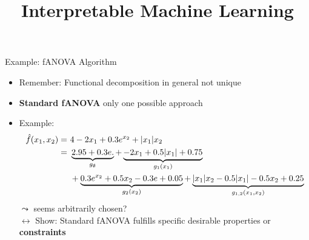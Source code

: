 \documentclass[10pt,compress,t,notes=noshow, xcolor=table]{beamer}
\title{Interpretable Machine Learning}
\date{}
\begin{document}


\begin{frame}{Example: fANOVA Algorithm}
    \begin{itemize}
        \item Remember: Functional decomposition in general not unique
        \item \textbf{Standard fANOVA} only one possible approach
        \item Example:
        \begin{align*}
            \hat{f}(x_1, x_2) =\,&\,4 - 2x_1 + 0.3 e^{x_2} + |x_1|x_2 \\
            =\,&\,\underbrace{2.95 + 0.3 e.}_{g_\emptyset} + \underbrace{-2x_1 + 0.5|x_1| + 0.75}_{g_1(x_1)} \\
            \,&\,+ \underbrace{0.3 e^{x_2} + 0.5x_2 - 0.3e + 0.05}_{g_2(x_2)} + \underbrace{|x_1| x_2 - 0.5 |x_1| - 0.5 x_2 + 0.25}_{g_{1,2}(x_1, x_2)}
        \end{align*}
        $\leadsto$ seems arbitrarily chosen? \\
        $\longleftrightarrow$ Show: Standard fANOVA fulfills specific desirable properties or \textbf{constraints}
    \end{itemize}




    
\end{frame}
\end{document}
